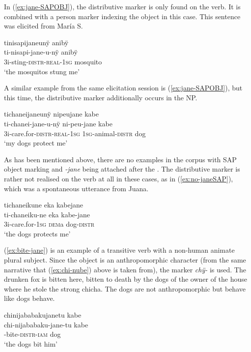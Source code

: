 In (\ref{ex:jane-SAPOBJ}), the distributive marker is only found on the verb. It is combined with a person marker indexing the object in this case. This sentence was elicited from María S.

\ea\label{ex:jane-SAPOBJ}
\begingl
\glpreamble tinisapijaneunÿ anibÿ\\
\gla ti-nisapi-jane-u-nÿ anibÿ\\
\glb 3i-sting-\textsc{distr}-\textsc{real}-1\textsc{sg} mosquito\\
\glft ‘the mosquitos stung me’
\endgl
\trailingcitation{[rxx-e181101l-1]}
\xe

A similar example from the same elicitation session is (\ref{ex:jane-SAPOBJ}), but this time, the distributive marker additionally occurs in the NP.

\ea\label{ex:jane-SAPOBJ-2}
\begingl
\glpreamble tichaneijaneunÿ nipeujane kabe\\
\gla ti-chanei-jane-u-nÿ ni-peu-jane kabe\\
\glb 3i-care.for-\textsc{distr}-\textsc{real}-1\textsc{sg} 1\textsc{sg}-animal-\textsc{distr} dog\\
\glft ‘my dogs protect me’
\endgl
\trailingcitation{[rxx-e181101l-1]}
\xe

As has been mentioned above, there are no examples in the corpus with SAP object marking and \textit{-jane} being attached after the . The distributive marker is rather not realised on the verb at all in these cases, as in (\ref{ex:no-janeSAP}), which was a spontaneous utterance from Juana.

\ea\label{ex:no-janeSAP}
\begingl
\glpreamble tichaneikune eka kabejane\\
\gla ti-chaneiku-ne eka kabe-jane\\
\glb 3i-care.for-1\textsc{sg} \textsc{dem}a dog-\textsc{distr}\\
\glft ‘the dogs protects me’
\endgl
\trailingcitation{[jxx-e150925l-1.093]}
\xe

(\ref{ex:bite-jane}) is an example of a transitive verb with a non-human animate plural subject. Since the object is an anthropomorphic character (from the same narrative that (\ref{ex:chi-nube}) above is taken from), the marker \textit{chÿ-} is used. The drunken fox is bitten here, bitten to death by the dogs of the owner of the house where he stole the strong chicha. The dogs are not anthropomorphic but behave like dogs behave.

\ea\label{ex:bite-jane}
\begingl 
\glpreamble chinijababakujanetu kabe\\
\gla chi-nijababaku-jane-tu kabe\\ 
-bite-\textsc{distr}-\textsc{iam} dog\\ 
\glft ‘the dogs bit him’\\ 
\endgl
\trailingcitation{[jmx-n120429ls-x5.435]}
\xe
{}

